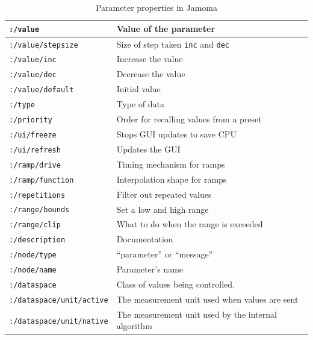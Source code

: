 \documentclass{article}
\begin{document}
\begin{table}
\begin{center}
\footnotesize\noindent
\begin{tabular}{| l | p{3cm} |}
	\hline
	\texttt{:/value}			& Value of the parameter \\
	\hline
	\texttt{:/value/stepsize}	& Size of step taken \texttt{inc} and \texttt{dec} \\
	\hline
	\texttt{:/value/inc}		& Increase the value \\
	\hline
	\texttt{:/value/dec}		& Decrease the value \\
	\hline
	\texttt{:/value/default}	& Initial value \\
	\hline
	\texttt{:/type} 			& Type of data \\
	\hline
	\texttt{:/priority} 		& Order for recalling values from a preset \\
	\hline
	\texttt{:/ui/freeze} 		& Stops GUI updates to save CPU \\
	\hline
	\texttt{:/ui/refresh} 		& Updates the GUI \\
	\hline
	\texttt{:/ramp/drive} 		& Timing mechanism for ramps \\
	\hline
	\texttt{:/ramp/function} 	& Interpolation shape for ramps \\
	\hline
	\texttt{:/repetitions} 		& Filter out repeated values \\
	\hline
	\texttt{:/range/bounds} 	& Set a low and high range \\
	\hline
	\texttt{:/range/clip} 		& What to do when the range is exceeded \\
	\hline
	\texttt{:/description} 		& Documentation \\
	\hline
	\texttt{:/node/type} 		& ``parameter'' or ``message'' \\
	\hline
	\texttt{:/node/name} 		& Parameter's name \\
	\hline
	\texttt{:/dataspace} 		& Class of values being controlled. \\
	\hline
	\texttt{:/dataspace/unit/active} 	& The measurement unit used when values are sent \\
	\hline
	\texttt{:/dataspace/unit/native} 	& The measurement unit used by the internal algorithm \\
	\hline
\end{tabular}
\end{center}
\caption{Parameter properties in Jamoma}
\label{tab:parameter_properties}
\end{table}
\end{document}
